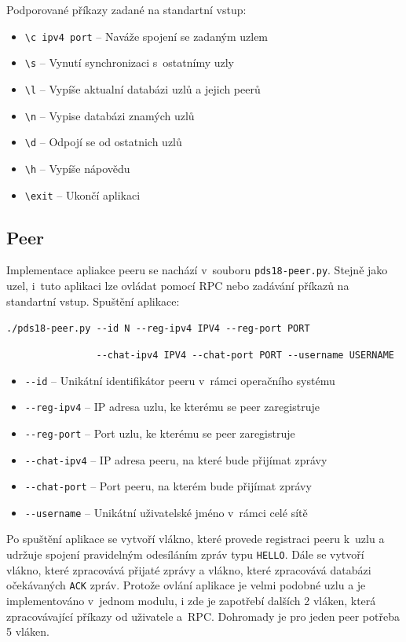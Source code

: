 \documentclass[11pt,a4paper,titlepage]{article}
\begin{document}
            Podporované příkazy zadané na standartní vstup:
            \begin{itemize}
                \item \verb+\c ipv4 port+ -- Naváže spojení se zadaným uzlem
                \item \verb+\s+ -- Vynutí synchronizaci s~ostatnímy uzly
                \item \verb+\l+ -- Vypíše aktualní databázi uzlů a jejich peerů
                \item \verb+\n+ -- Vypise databázi znamých uzlů
                \item \verb+\d+ -- Odpojí se od ostatnich uzlů
                \item \verb+\h+ -- Vypíše nápovědu
                \item \verb+\exit+ -- Ukončí aplikaci
            \end{itemize}

        \subsection{Peer}
            Implementace apliakce peeru se nachází v~souboru \texttt{pds18-peer.py}. Stejně jako uzel, i~tuto aplikaci lze
            ovládat pomocí RPC nebo zadávání příkazů na standartní vstup. Spuštění aplikace:

            \verb+./pds18-peer.py --id N --reg-ipv4 IPV4 --reg-port PORT+

            \verb+                --chat-ipv4 IPV4 --chat-port PORT --username USERNAME+
            \begin{itemize}
                \item \verb+--id+ -- Unikátní identifikátor peeru v~rámci operačního systému
                \item \verb+--reg-ipv4+ -- IP adresa uzlu, ke kterému se peer zaregistruje
                \item \verb+--reg-port+ -- Port uzlu, ke kterému se peer zaregistruje
                \item \verb+--chat-ipv4+ -- IP adresa peeru, na které bude přijímat zprávy
                \item \verb+--chat-port+ -- Port peeru, na kterém bude přijímat zprávy
                \item \verb+--username+ -- Unikátní uživatelské jméno v~rámci celé sítě
            \end{itemize}

            Po spuštění aplikace se vytvoří vlákno, které provede registraci peeru k~uzlu a udržuje spojení
            pravidelným odesíláním zpráv typu \texttt{HELLO}. Dále se vytvoří vlákno, které zpracovává přijaté
            zprávy a vlákno, které zpracovává databázi očekávaných \texttt{ACK} zpráv. Protože ovlání aplikace je velmi
            podobné uzlu a je implementováno v~jednom modulu, i zde je zapotřebí dalších 2 vláken, která zpracovávající
            příkazy od uživatele a~RPC. Dohromady je pro jeden peer potřeba 5 vláken.
\end{document}
